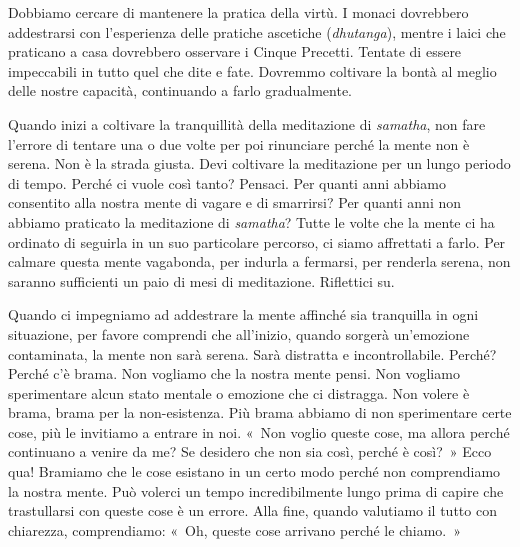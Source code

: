Dobbiamo cercare di mantenere la pratica della virtù. I monaci
dovrebbero addestrarsi con l'esperienza delle pratiche ascetiche
(\emph{dhutanga}), mentre i laici che praticano a casa dovrebbero
osservare i Cinque Precetti. Tentate di essere impeccabili in tutto quel
che dite e fate. Dovremmo coltivare la bontà al meglio delle nostre
capacità, continuando a farlo gradualmente.

Quando inizi a coltivare la tranquillità della meditazione di
\emph{samatha}, non fare l'errore di tentare una o due volte per poi
rinunciare perché la mente non è serena. Non è la strada giusta. Devi
coltivare la meditazione per un lungo periodo di tempo. Perché ci vuole
così tanto? Pensaci. Per quanti anni abbiamo consentito alla nostra
mente di vagare e di smarrirsi? Per quanti anni non abbiamo praticato la
meditazione di \emph{samatha}? Tutte le volte che la mente ci ha
ordinato di seguirla in un suo particolare percorso, ci siamo affrettati
a farlo. Per calmare questa mente vagabonda, per indurla a fermarsi, per
renderla serena, non saranno sufficienti un paio di mesi di meditazione.
Riflettici su.

Quando ci impegniamo ad addestrare la mente affinché sia tranquilla in
ogni situazione, per favore comprendi che all'inizio, quando sorgerà
un'emozione contaminata, la mente non sarà serena. Sarà distratta e
incontrollabile. Perché? Perché c'è brama. Non vogliamo che la nostra
mente pensi. Non vogliamo sperimentare alcun stato mentale o emozione
che ci distragga. Non volere è brama, brama per la non-esistenza. Più
brama abbiamo di non sperimentare certe cose, più le invitiamo a entrare
in noi. «~Non voglio queste cose, ma allora perché continuano a venire
da me? Se desidero che non sia così, perché è così?~» Ecco qua! Bramiamo
che le cose esistano in un certo modo perché non comprendiamo la nostra
mente. Può volerci un tempo incredibilmente lungo prima di capire che
trastullarsi con queste cose è un errore. Alla fine, quando valutiamo il
tutto con chiarezza, comprendiamo: «~Oh, queste cose arrivano perché le
chiamo.~»

